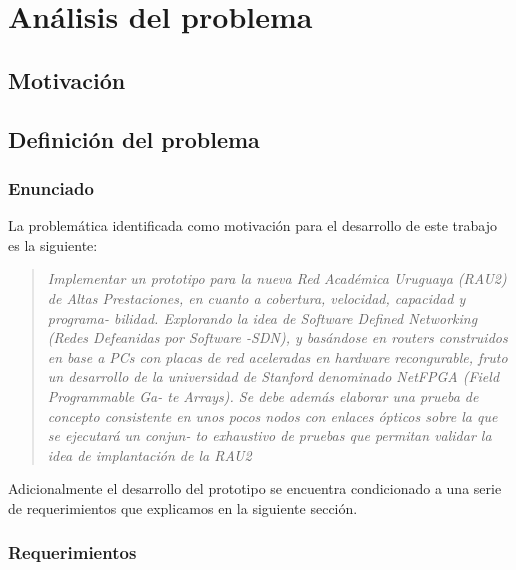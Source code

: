 
\chapter{An\'alisis del problema}

\ifpdf
    \graphicspath{{Chapter2/Figs/Raster/}{Chapter2/Figs/PDF/}{Chapter2/Figs/}}
\else
    \graphicspath{{Chapter2/Figs/Vector/}{Chapter2/Figs/}}
\fi


\section[Short title]{Motivaci\'on}

\section[Short title]{Definici\'on del problema}

\subsection[Short title]{Enunciado}

La problem\'atica identificada como motivaci\'on para el desarrollo de este trabajo es la siguiente:

\begin{quote}
\textit{Implementar un prototipo para la nueva Red Académica Uruguaya (RAU2) de
Altas Prestaciones, en cuanto a cobertura, velocidad, capacidad y programa-
bilidad. Explorando la idea de Software Defined Networking (Redes Defeanidas
por Software -SDN), y basándose en routers construidos en base a PCs con
placas de red aceleradas en hardware recongurable, fruto un desarrollo de
la universidad de Stanford denominado NetFPGA (Field Programmable Ga-
te Arrays). Se debe además elaborar una prueba de concepto consistente en
unos pocos nodos con enlaces ópticos sobre la que se ejecutará un conjun-
to exhaustivo de pruebas que permitan validar la idea de implantación de la
RAU2}
\end{quote}

Adicionalmente el desarrollo del prototipo se encuentra condicionado a una serie de requerimientos que explicamos en la siguiente secci\'on.

\subsection[Short title]{Requerimientos}

